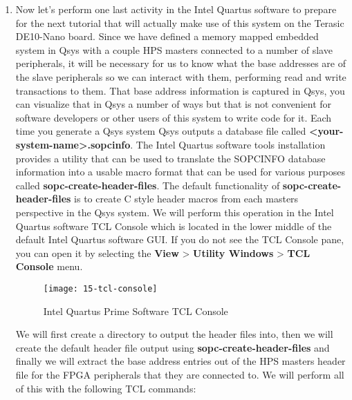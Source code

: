 \begin{flushleft}
\begin{enumerate}[
	label=\textbf{Step \arabic*.},
	leftmargin=*,
	widest={00},
	align=left]
\item Now let's perform one last activity in the Intel Quartus software to prepare for the next tutorial that will actually make use of this system on the Terasic DE10-Nano board.  Since we have defined a memory mapped embedded system in Qsys with a couple HPS masters connected to a number of slave peripherals, it will be necessary for us to know what the base addresses are of the slave peripherals so we can interact with them, performing read and write transactions to them.  That base address information is captured in Qsys, you can visualize that in Qsys a number of ways but that is not convenient for software developers or other users of this system to write code for it.  Each time you generate a Qsys system Qsys outputs a database file called \textbf{<your-\allowbreak system-\allowbreak name>.sopcinfo}.  The Intel Quartus software tools installation provides a utility that can be used to translate the SOPCINFO database information into a usable macro format that can be used for various purposes called \textbf{sopc-create-header-files}.  The default functionality of \textbf{sopc-\allowbreak create-\allowbreak header-\allowbreak files} is to create C style header macros from each masters perspective in the Qsys system.  We will perform this operation in the Intel Quartus software TCL Console which is located in the lower middle of the default Intel Quartus software GUI.  If you do not see the TCL Console pane, you can open it by selecting the \textbf{View} > \textbf{Utility Windows} > \textbf{TCL Console} menu.

\begin{figure}[H]
\centering
\texttt{[image: 15-tcl-console]}
\caption{Intel Quartus Prime Software TCL Console}
\label{fig:15-tcl-console}
\end{figure}

We will first create a directory to output the header files into, then we will create the default header file output using \textbf{sopc-create-header-files} and finally we will extract the base address entries out of the HPS masters header file for the FPGA peripherals that they are connected to.  We will perform all of this with the following TCL commands:

\begin{verbatim}


\end{verbatim}
\end{enumerate}
\end{flushleft}
